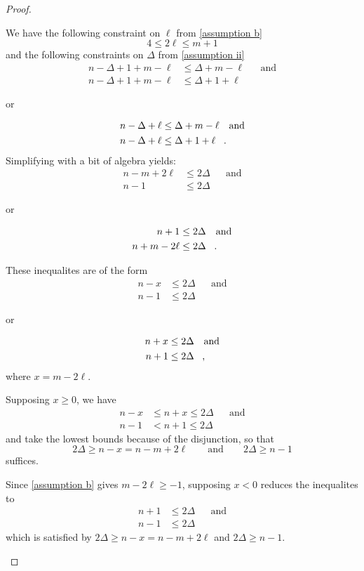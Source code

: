 \begin{proof}
\begin{proofpart}
\begin{itemize}
  We have the following constraint on $\ell$ from \ref{assumption b}
  \[ 4 \leq 2 \ell \leq m + 1 \]
  and the following constraints on $\Delta$ from \ref{assumption ii}
  \begin{align*}
   n - \Delta + 1 + m - \ell &\leq \Delta + m - \ell && \text{and} \\
   n - \Delta + 1 + m - \ell &\leq \Delta + 1 + \ell
  \end{align*}
  \begin{center}or\end{center}
    \begin{align*}
     n - \Delta + \ell &\leq \Delta + m - \ell && \text{and} \\
     n - \Delta + \ell &\leq \Delta + 1 + \ell \mperiod
    \end{align*}
  Simplifying with a bit of algebra yields:
  \begin{align*}
   n-m +2\ell &\leq 2 \Delta && \text{and} \\
   n-1 &\leq 2\Delta
  \end{align*}
  \begin{center}or\end{center}
  \begin{align*}
   n + 1 &\leq 2 \Delta && \text{and} \\
   n + m - 2\ell &\leq 2 \Delta \mperiod
  \end{align*}

  These inequalites are of the form
  \begin{align*}
   n-x &\leq 2 \Delta && \text{and} \\
   n-1 &\leq 2\Delta
  \end{align*}
  \begin{center}or\end{center}
  \begin{align*}
   n + x &\leq 2 \Delta && \text{and} \\
   n + 1 &\leq 2 \Delta \mcomma
  \end{align*}
where $x = m -2\ell$.

  Supposing $x\geq 0$, we have
  \begin{align*}
   n-x &\leq n+x \leq 2 \Delta && \text{and} \\
   n-1 &< n+1 \leq 2 \Delta
  \end{align*}
  and take the lowest bounds because of the disjunction, so that
   \[2\Delta \geq n-x = n-m+2\ell \qquad \text{and} \qquad 2\Delta \geq n-1\]
    suffices.

  Since \ref{assumption b} gives $m-2\ell \geq -1$, supposing $x < 0$ reduces the inequalites to
  \begin{align*}
   n+1 &\leq 2 \Delta && \text{and} \\
   n-1 &\leq 2 \Delta
  \end{align*}
  which is satisfied by $2\Delta \geq n-x = n-m+2\ell$ and $2\Delta \geq n-1$.


\end{itemize}
\end{proofpart}
\end{proof}
